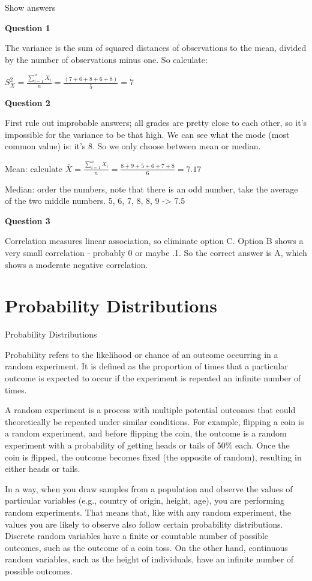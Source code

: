 \documentclass[
  letterpaper,
]{scrbook}
\begin{document}
Show answers

\textbf{Question 1}

The variance is the sum of squared distances of observations to the
mean, divided by the number of observations minus one. So calculate:

\(S_{X}^2= \frac{\sum_{i=1}^nX_i}{n} = \frac{(7 + 6 + 8 + 6 + 8)}{5} = 7\)

\textbf{Question 2}

First rule out improbable answers; all grades are pretty close to each
other, so it's impossible for the variance to be that high. We can see
what the mode (most common value) is: it's 8. So we only choose between
mean or median.

Mean: calculate
\(\bar{X}= \frac{\sum_{i=1}^nX_i}{n} = \frac{8 + 9 + 5 + 6 + 7 + 8}{6} = 7.17\)

Median: order the numbers, note that there is an odd number, take the
average of the two middle numbers. 5, 6, 7, 8, 8, 9 -\textgreater{} 7.5

\textbf{Question 3}

Correlation measures linear association, so eliminate option C. Option B
shows a very small correlation - probably 0 or maybe .1. So the correct
answer is A, which shows a moderate negative correlation.


\hypertarget{sec-probability}{%
\chapter{Probability Distributions}\label{sec-probability}}

Probability Distributions

Probability refers to the likelihood or chance of an outcome occurring
in a random experiment. It is defined as the proportion of times that a
particular outcome is expected to occur if the experiment is repeated an
infinite number of times.

A random experiment is a process with multiple potential outcomes that
could theoretically be repeated under similar conditions. For example,
flipping a coin is a random experiment, and before flipping the coin,
the outcome is a random experiment with a probability of getting heads
or tails of 50\% each. Once the coin is flipped, the outcome becomes
fixed (the opposite of random), resulting in either heads or tails.

In a way, when you draw samples from a population and observe the values
of particular variables (e.g., country of origin, height, age), you are
performing random experiments. That means that, like with any random
experiment, the values you are likely to observe also follow certain
probability distributions. Discrete random variables have a finite or
countable number of possible outcomes, such as the outcome of a coin
toss. On the other hand, continuous random variables, such as the height
of individuals, have an infinite number of possible outcomes.
\end{document}
